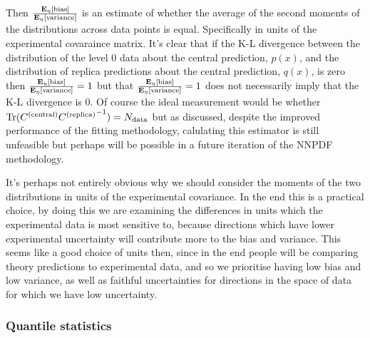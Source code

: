 Then $\frac{\mathbf{E}_{\eta}\left[ {\rm bias} \right]}{\mathbf{E}_{\eta}\left[ {\rm variance} \right]}$ is an estimate of whether the average
of the second moments of the distributions across data points is equal. Specifically
in units of the experimental covaraince matrix. It's clear that if the K-L
divergence between the distribution of the level 0 data about the
central prediction, $p(x)$, and the distribution of replica predictions about the central
prediction, $q(x)$, is zero then $\frac{\mathbf{E}_{\eta}\left[ {\rm bias} \right]}{\mathbf{E}_{\eta}\left[ {\rm variance} \right]} = 1$
but that $\frac{\mathbf{E}_{\eta}\left[ {\rm bias} \right]}{\mathbf{E}_{\eta}\left[ {\rm variance} \right]} = 1$ does not necessarily
imply that the K-L divergence is 0. Of course the ideal measurement would be
whether ${\rm Tr} (C^{(\rm central)} {C^{(\rm replica)}}^{-1}) = N_{\rm data}$ but as discussed, despite
the improved performance of the fitting methodology, calulating this estimator
is still unfeasible but perhaps will be possible in a future iteration of the
NNPDF methodology.

It's perhaps not entirely obvious why we should consider the moments of the two
distributions in units of the experimental covariance. In the end this is a
practical choice, by doing this we are examining the differences in units which
the experimental data is most sensitive to, because directions which have lower
experimental uncertainty will contribute more to the bias and variance. This
seems like a good choice of units then, since in the end people will be comparing
theory predictions to experimental data, and so we prioritise having low bias
and low variance, as well as faithful uncertainties for directions in the space
of data for which we have low uncertainty.

\subsubsection{Quantile statistics}

